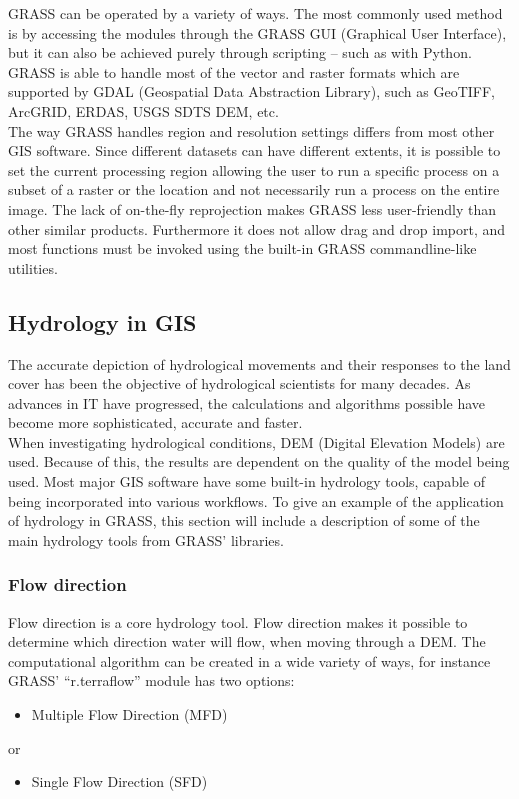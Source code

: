 GRASS can be operated by a variety of ways. The most commonly used method is by accessing the modules through the GRASS GUI (Graphical User Interface), but it can also be achieved purely through scripting – such as with Python. GRASS is able to handle most of the vector and raster formats which are supported by GDAL (Geospatial Data Abstraction Library), such as GeoTIFF, ArcGRID, ERDAS, USGS SDTS DEM, etc. \\
The way GRASS handles region and resolution settings differs from most other GIS software. Since different datasets can have different extents, it is possible to set the current processing region allowing the user to run a specific process on a subset of a raster or the location and not necessarily run a process on the entire image. 
The lack of on-the-fly reprojection makes GRASS less user-friendly than other similar products. Furthermore it does not allow drag and drop import, and most functions must be invoked using the built-in GRASS commandline-like utilities.

\subsection{Hydrology in GIS}

The accurate depiction of hydrological movements and their responses to the land cover has been the objective of hydrological scientists for many decades. As advances in IT have progressed, the calculations and algorithms possible have become more sophisticated, accurate and faster. \\

When investigating hydrological conditions, DEM (Digital Elevation Models) are used. Because of this, the results are dependent on the quality of the model being used. Most major GIS software have some built-in hydrology tools, capable of being incorporated into various workflows. To give an example of the application of hydrology in GRASS, this section will include a description of some of the main hydrology tools from GRASS' libraries.

\subsubsection{Flow direction}
Flow direction is a core hydrology tool. Flow direction makes it possible to determine which direction water will flow, when moving through a DEM. The computational algorithm can be created in a wide variety of ways, for instance GRASS' “r.terraflow” module has two options: 
\begin{itemize}
\item Multiple Flow Direction (MFD) 
\end{itemize}
or 
\begin{itemize}
\item Single Flow Direction (SFD)
\end{itemize}
 
